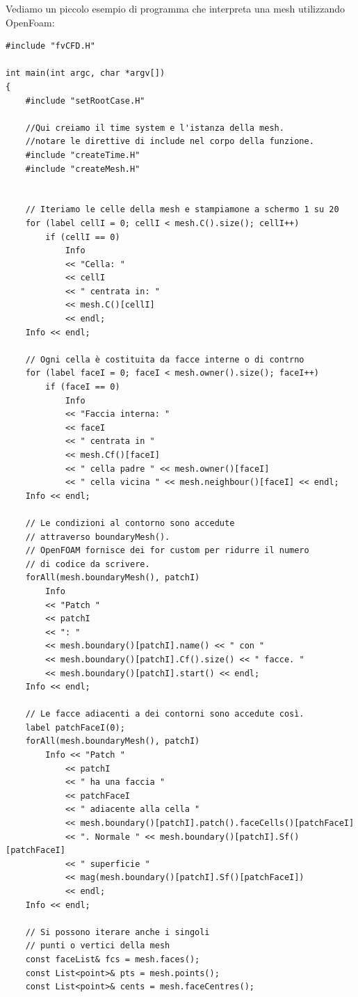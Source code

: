     Vediamo un piccolo esempio di programma che interpreta una mesh utilizzando OpenFoam:
    \begin{verbatim}
#include "fvCFD.H"

int main(int argc, char *argv[])
{
    #include "setRootCase.H"

    //Qui creiamo il time system e l'istanza della mesh.
    //notare le direttive di include nel corpo della funzione.
    #include "createTime.H"
    #include "createMesh.H"


    // Iteriamo le celle della mesh e stampiamone a schermo 1 su 20
    for (label cellI = 0; cellI < mesh.C().size(); cellI++)
        if (cellI == 0)
            Info
            << "Cella: "
            << cellI
            << " centrata in: "
            << mesh.C()[cellI]
            << endl;
    Info << endl;

    // Ogni cella è costituita da facce interne o di contrno
    for (label faceI = 0; faceI < mesh.owner().size(); faceI++)
        if (faceI == 0)
            Info
            << "Faccia interna: "
            << faceI
            << " centrata in "
            << mesh.Cf()[faceI]
            << " cella padre " << mesh.owner()[faceI]
            << " cella vicina " << mesh.neighbour()[faceI] << endl;
    Info << endl;

    // Le condizioni al contorno sono accedute
    // attraverso boundaryMesh().
    // OpenFOAM fornisce dei for custom per ridurre il numero
    // di codice da scrivere.
    forAll(mesh.boundaryMesh(), patchI)
        Info 
        << "Patch " 
        << patchI 
        << ": " 
        << mesh.boundary()[patchI].name() << " con "
        << mesh.boundary()[patchI].Cf().size() << " facce. "
        << mesh.boundary()[patchI].start() << endl;
    Info << endl;

    // Le facce adiacenti a dei contorni sono accedute così.
    label patchFaceI(0);
    forAll(mesh.boundaryMesh(), patchI)
        Info << "Patch " 
            << patchI 
            << " ha una faccia " 
            << patchFaceI 
            << " adiacente alla cella "
            << mesh.boundary()[patchI].patch().faceCells()[patchFaceI]
            << ". Normale " << mesh.boundary()[patchI].Sf()[patchFaceI]
            << " superficie " 
            << mag(mesh.boundary()[patchI].Sf()[patchFaceI])
            << endl;
    Info << endl;

    // Si possono iterare anche i singoli 
    // punti o vertici della mesh
    const faceList& fcs = mesh.faces();
    const List<point>& pts = mesh.points();
    const List<point>& cents = mesh.faceCentres();


\end{verbatim}
